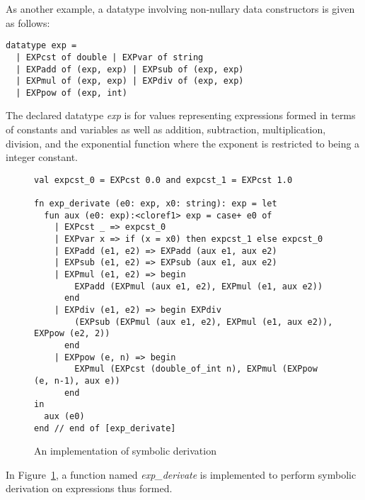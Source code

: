 As another example, a datatype involving non-nullary data constructors is
given as follows:
\begin{verbatim}
datatype exp =
  | EXPcst of double | EXPvar of string
  | EXPadd of (exp, exp) | EXPsub of (exp, exp)
  | EXPmul of (exp, exp) | EXPdiv of (exp, exp)
  | EXPpow of (exp, int)
\end{verbatim}
The declared datatype {\it exp} is for values representing expressions
formed in terms of constants and variables as well as addition,
subtraction, multiplication, division, and the exponential function where
the exponent is restricted to being a integer constant.
\begin{figure}[thp]
\begin{verbatim}
val expcst_0 = EXPcst 0.0 and expcst_1 = EXPcst 1.0

fn exp_derivate (e0: exp, x0: string): exp = let
  fun aux (e0: exp):<cloref1> exp = case+ e0 of
    | EXPcst _ => expcst_0
    | EXPvar x => if (x = x0) then expcst_1 else expcst_0
    | EXPadd (e1, e2) => EXPadd (aux e1, aux e2)
    | EXPsub (e1, e2) => EXPsub (aux e1, aux e2)
    | EXPmul (e1, e2) => begin
        EXPadd (EXPmul (aux e1, e2), EXPmul (e1, aux e2))
      end
    | EXPdiv (e1, e2) => begin EXPdiv
        (EXPsub (EXPmul (aux e1, e2), EXPmul (e1, aux e2)), EXPpow (e2, 2))
      end
    | EXPpow (e, n) => begin
        EXPmul (EXPcst (double_of_int n), EXPmul (EXPpow (e, n-1), aux e))
      end
in
  aux (e0)
end // end of [exp_derivate]
\end{verbatim}
\caption{An implementation of symbolic derivation}
\label{figure:symbolic_derivation}
\end{figure}
In Figure~\ref{figure:symbolic_derivation}, a function named
{\it exp\_derivate} is implemented to perform symbolic derivation
on expressions thus formed.

